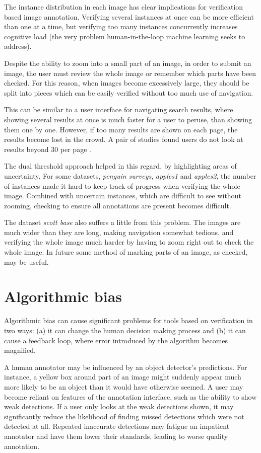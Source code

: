 The instance distribution in each image has clear implications for verification based image annotation. Verifying several instances at once can be more efficient than one at a time, but verifying too many instances concurrently increases cognitive load (the very problem human-in-the-loop machine learning seeks to address). 

Despite the ability to zoom into a small part of an image, in order to submit an image, the user must review the whole image or remember which parts have been checked. For this reason, when images become excessively large, they should be split into pieces which can be easily verified without too much use of navigation.

This can be similar to a user interface for navigating search results, where showing several results at once is much faster for a user to peruse, than showing them one by one. However, if too many results are shown on each page, the results become lost in the crowd. A pair of studies found users do not look at results beyond 30 per page \cite{PunchoojitLumpapun2017, Zhou2007}.

The dual threshold approach helped in this regard, by highlighting areas of uncertainty. For some datasets, \emph{penguin surveys}, \emph{apples1} and \emph{apples2}, the number of instances made it hard to keep track of progress when verifying the whole image. Combined with uncertain instances, which are difficult to see without zooming, checking to ensure all annotations are present becomes difficult.

The dataset \emph{scott base} also suffers a little from this problem. The images are much wider than they are long, making navigation somewhat tedious, and verifying the whole image much harder by having to zoom right out to check the whole image. In future some method of marking parts of an image, as checked, may be useful.

\section{Algorithmic bias}
\label{sec:machine_bias}

Algorithmic bias can cause significant problems for tools based on verification in two ways: (a) it can change the human decision making process and (b) it can cause a feedback loop, where error introduced by the algorithm becomes magnified.

A human annotator may be influenced by an object detector's predictions. For instance, a yellow box around part of an image might suddenly appear much more likely to be an object than it would have otherwise seemed. A user may become reliant on features of the annotation interface, such as the ability to show weak detections. If a user only looks at the weak detections shown, it may significantly reduce the likelihood of finding missed detections which were not detected at all. Repeated inaccurate detections may fatigue an impatient annotator and have them lower their standards, leading to worse quality annotation. 

